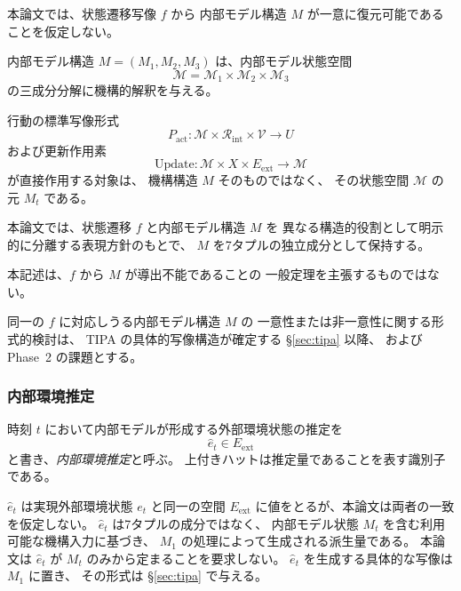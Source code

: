 \begin{remark}[$M$ の独立成分としての保持]
\label{rem:M_independence}

本論文では、状態遷移写像 $f$ から
内部モデル構造 $M$ が一意に復元可能であることを仮定しない。

内部モデル構造
$M=(M_1,M_2,M_3)$
は、内部モデル状態空間
\[
  \mathcal{M}
  =
  \mathcal{M}_1
  \times
  \mathcal{M}_2
  \times
  \mathcal{M}_3
\]
の三成分分解に機構的解釈を与える。

行動の標準写像形式
\[
  P_{\mathrm{act}}:\mathcal M\times\mathcal R_{\mathrm{int}}\times\mathcal V\to U
\]
および更新作用素
\[
  \mathrm{Update}:
  \mathcal{M}\times X\times E_{\mathrm{ext}}
  \to\mathcal{M}
\]
が直接作用する対象は、
機構構造 $M$ そのものではなく、
その状態空間 $\mathcal{M}$ の元 $M_t$ である。

本論文では、状態遷移 $f$ と内部モデル構造 $M$ を
異なる構造的役割として明示的に分離する表現方針のもとで、
$M$ を7タプルの独立成分として保持する。

本記述は、$f$ から $M$ が導出不能であることの
一般定理を主張するものではない。

同一の $f$ に対応しうる内部モデル構造 $M$ の
一意性または非一意性に関する形式的検討は、
TIPA の具体的写像構造が確定する
\S\ref{sec:tipa} 以降、
および Phase~2 の課題とする。
\end{remark}

\subsubsection{内部環境推定}

\begin{definition}
\label{def:internal_env_estimate}

時刻 $t$ において内部モデルが形成する外部環境状態の推定を
\[
  \hat{e}_t\in E_{\mathrm{ext}}
\]
と書き、\emph{内部環境推定}と呼ぶ。
上付きハットは推定量であることを表す識別子である。

$\hat{e}_t$ は実現外部環境状態 $e_t$ と同一の空間
$E_{\mathrm{ext}}$ に値をとるが、本論文は両者の一致を仮定しない。
$\hat{e}_t$ は7タプルの成分ではなく、
内部モデル状態 $M_t$ を含む利用可能な機構入力に基づき、
$M_1$ の処理によって生成される派生量である。
本論文は $\hat{e}_t$ が $M_t$ のみから定まることを要求しない。
$\hat{e}_t$ を生成する具体的な写像は $M_1$ に置き、
その形式は \S\ref{sec:tipa} で与える。
\end{definition}

